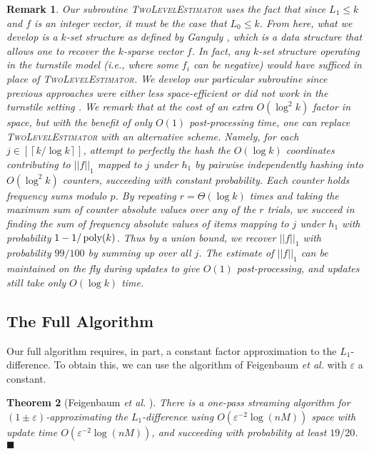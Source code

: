 \documentclass[letterpaper,11pt]{article}
\newcommand{\eps}{\varepsilon}
\newcommand{\ceil}[1]{\left\lceil #1 \right\rceil}
\newcommand{\SectionName}[1]{\label{sec:#1}}
\newcommand{\TheoremName}[1]{\label{thm:#1}}
\newtheorem{theorem}{Theorem}\newtheorem{corollary}[theorem]{Corollary}
\newtheorem{remark}[theorem]{Remark}
\newcommand{\proofbelow}{3pt}
\newcommand{\afterproof}{\hfill $\blacksquare$ \par \vspace{\proofbelow}}
\newcommand{\poly}{\mathop{{\rm poly}}}
\begin{document}
\begin{remark}
Our subroutine \textsc{TwoLevelEstimator} uses the fact that since
$L_1\le k$ and $f$ is an integer vector, it must be the case that $L_0
\le k$.  From here, what we develop is a {\em $k$-set structure} as
defined by Ganguly \cite{Ganguly07}, which is a data structure
that allows one to recover the $k$-sparse vector $f$.  In fact, any
$k$-set structure operating in the turnstile model (i.e., where some
$f_i$ can be negative) would have sufficed in place of
\textsc{TwoLevelEstimator}.  We develop our
particular subroutine since previous approaches were either less
space-efficient or did not work in the turnstile setting
\cite{GM06,Ganguly07}.  We remark that at the cost of an
extra $O(\log^2 k)$ factor in space, but with the benefit of only
$O(1)$ post-processing time, one can replace
\textsc{TwoLevelEstimator} with an alternative scheme.  Namely, for each
$j\in [\ceil{k/\log k}]$, attempt to perfectly the hash the $O(\log
k)$ coordinates contributing to $||f||_1$ mapped to $j$ under $h_1$ by
pairwise independently hashing into
$O(\log^2 k)$ counters, succeeding with
constant probability.  Each counter holds frequency sums modulo $p$.
By repeating $r=\Theta(\log k)$
times and taking the maximum sum of counter absolute values over any
of the $r$ trials, we succeed in finding the sum of frequency absolute
values of items mapping to $j$ under $h_1$ with probability $1 -
1/\poly(k)$. Thus
by a union bound, we recover $||f||_1$ with probability $99/100$ by
summing up over all $j$.  The
estimate of $||f||_1$ can be maintained on the fly during updates to
give $O(1)$ post-processing, and
updates still take only $O(\log k)$ time.
\end{remark}

\subsection{The Full Algorithm}\SectionName{full-stream}
Our full algorithm requires, in part, a constant factor approximation
to the $L_1$-difference.  To obtain this, we can use the algorithm of
Feigenbaum {\it et al.} \cite{FKSV02} with $\eps$ a constant.

\begin{theorem}[Feigenbaum {\it et al.} {\cite[Theorem
    12]{FKSV02}}]\TheoremName{feig}
There is a one-pass streaming algorithm for $(1\pm\eps)$-approximating
the $L_1$-difference using $O(\eps^{-2}\log(nM))$
space with update time $O(\eps^{-2}\log(nM))$, and succeeding with
probability at least $19/20$.\afterproof
\end{theorem}
\end{document}
